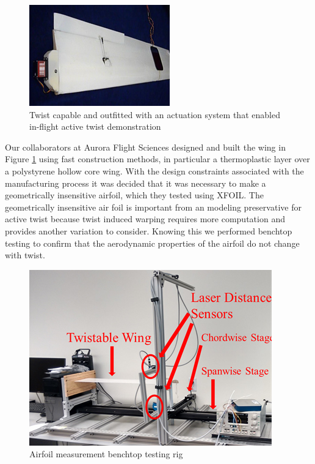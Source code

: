 \documentclass[11pt]{ucthesis}
\begin{document}
\begin{figure}[h]
\centering
\includegraphics[width=0.5\linewidth]{Figures/AuroraWing.png}
\caption{Twist capable and outfitted with an actuation system that enabled in-flight active twist demonstration}
\label{fig:Awing}
\end{figure}

Our collaborators at Aurora Flight Sciences designed and built the wing in Figure \ref{fig:Awing} using fast construction methods, in particular a thermoplastic layer over a polystyrene hollow core wing. With the design constraints associated with the manufacturing process it was decided that it was necessary to make a geometrically insensitive airfoil, which they tested using XFOIL. The geometrically insensitive air foil is important from an modeling preservative for active twist because twist induced warping requires more computation and provides another variation to consider. Knowing this we performed benchtop testing to confirm that the aerodynamic properties of the airfoil do not change with twist.

\begin{figure}[h]
\centering
\includegraphics[width=0.75\linewidth]{Figures/AuroraWingBenchtopTest.png}
\caption{Airfoil measurement benchtop testing rig}
\label{fig:Atestrig}
\end{figure}
\end{document}
